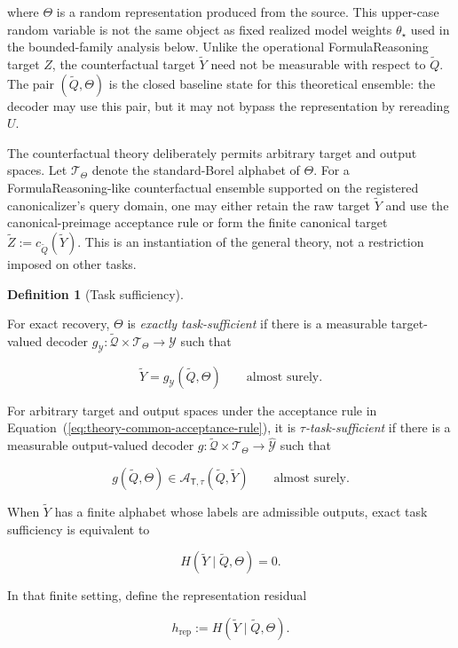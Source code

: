 \documentclass[10pt]{article} %
\renewcommand{\eqref}[1]{\textup{(\ref{#1})}}
\providecommand{\1}{\mathbf{1}}  %
\theoremstyle{remark}
\theoremstyle{definition}
\newtheorem{definition}{Definition}[section]
\begin{document}
where $\Theta$ is a random representation produced from the source. This upper-case random variable is not the same object as fixed realized model weights $\theta_\star$ used in the bounded-family analysis below. Unlike the operational FormulaReasoning target $Z$, the counterfactual target $\widetilde Y$ need not be measurable with respect to $\widetilde Q$. The pair $(\widetilde Q,\Theta)$ is the closed baseline state for this theoretical ensemble: the decoder may use this pair, but it may not bypass the representation by rereading $U$.

The counterfactual theory deliberately permits arbitrary target and output spaces. Let $\mathcal T_\Theta$ denote the standard-Borel alphabet of $\Theta$. For a FormulaReasoning-like counterfactual ensemble supported on the registered canonicalizer's query domain, one may either retain the raw target $\widetilde Y$ and use the canonical-preimage acceptance rule or form the finite canonical target $\widetilde Z:=c_{\widetilde Q}(\widetilde Y)$. This is an instantiation of the general theory, not a restriction imposed on other tasks.

\begin{definition}[Task sufficiency]
\label{def:task-sufficiency}

For exact recovery, $\Theta$ is \emph{exactly task-sufficient} if there is a measurable target-valued decoder $g_{\mathcal Y}:\widetilde{\mathcal Q}\times\mathcal T_\Theta\to\mathcal Y$ such that

\begin{equation}
\widetilde Y=g_{\mathcal Y}(\widetilde Q,\Theta)
\qquad\text{almost surely}.
\label{eq:task-sufficient-decoder}
\end{equation}

For arbitrary target and output spaces under the acceptance rule in Equation~\eqref{eq:theory-common-acceptance-rule}, it is \emph{$\tau$-task-sufficient} if there is a measurable output-valued decoder $g:\widetilde{\mathcal Q}\times\mathcal T_\Theta\to\widehat{\mathcal Y}$ such that

\begin{equation}
g(\widetilde Q,\Theta)
\in
\mathcal A_{\mathsf T,\tau}(\widetilde Q,\widetilde Y)
\qquad\text{almost surely}.
\label{eq:tolerance-task-sufficient-decoder}
\end{equation}

When $\widetilde Y$ has a finite alphabet whose labels are admissible outputs, exact task sufficiency is equivalent to

\begin{equation}
H(\widetilde Y\mid\widetilde Q,\Theta)=0.
\end{equation}

In that finite setting, define the representation residual

\begin{equation}
h_{\mathrm{rep}}
:=
H(\widetilde Y\mid\widetilde Q,\Theta).
\label{eq:representation-residual}
\end{equation}

\end{definition}
\end{document}
